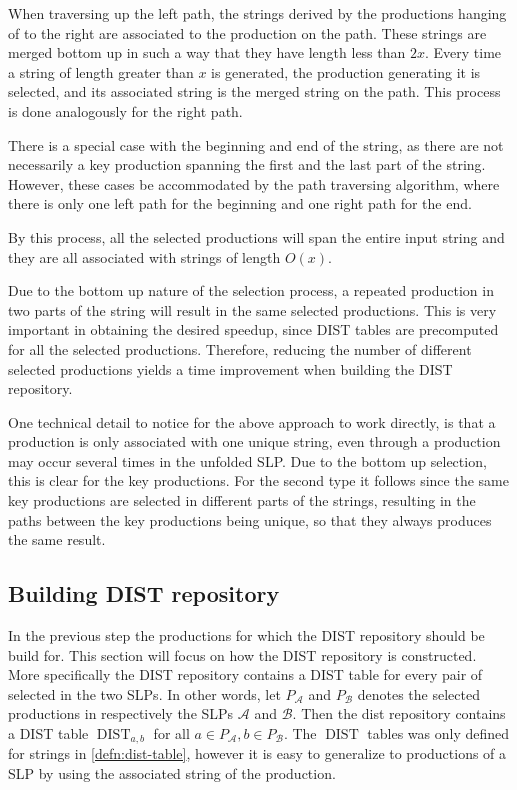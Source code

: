 \documentclass[twoside,11pt,openright]{report}
\newcommand{\DIST}{\operatorname{DIST}}
\begin{document}
When traversing up the left path, the strings derived by the productions hanging of to the right are associated to the production on the path. These strings are merged bottom up in such a way that they have length less than $2x$. Every time a string of length greater than $x$ is generated, the production generating it is selected, and its associated string is the merged string on the path. This process is done analogously for the right path.

There is a special case with the beginning and end of the string, as there are not necessarily a key production spanning the first and the last part of the string. However, these cases be accommodated by the path traversing algorithm, where there is only one left path for the beginning and one right path for the end.

By this process, all the selected productions will span the entire input string and they are all associated with strings of length $O(x)$.

Due to the bottom up nature of the selection process, a repeated production in two parts of the string will result in the same selected productions. This is very important in obtaining the desired speedup, since DIST tables are precomputed for all the selected productions. Therefore, reducing the number of different selected productions yields a time improvement when building the DIST repository.

One technical detail to notice for the above approach to work directly, is that a production is only associated with one unique string, even through a production may occur several times in the unfolded SLP. Due to the bottom up selection, this is clear for the key productions. For the second type it follows since the same key productions are selected in different parts of the strings, resulting in the paths between the key productions being unique, so that they always produces the same result.

\subsection{Building DIST repository}
\label{sec:algorithm:building-DISTs-overview}
In the previous step the productions for which the DIST repository should be build for. This section will focus on how the DIST repository is constructed. More specifically the DIST repository contains a DIST table for every pair of selected in the two SLPs. In other words, let $P_\mathcal{A}$ and $P_\mathcal{B}$ denotes the selected productions in respectively the SLPs $\mathcal{A}$ and $\mathcal{B}$. Then the dist repository contains a DIST table $\DIST_{a,b}$ for all $a \in P_\mathcal{A}, b \in P_{\mathcal{B}}$. The $\DIST$ tables was only defined for strings in \cref{defn:dist-table}, however it is easy to generalize to productions of a SLP by using the associated string of the production.
\end{document}
